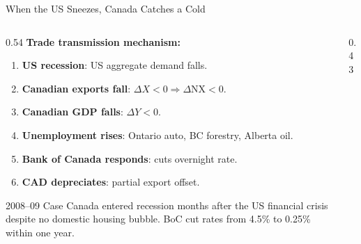 \documentclass[aspectratio=169]{beamer}
\begin{document}
\begin{frame}{When the US Sneezes, Canada Catches a Cold}
\begin{columns}[T]
\begin{column}{0.54\textwidth}
\textbf{Trade transmission mechanism:}
\begin{enumerate}\small
  \item \textbf{US recession}: US aggregate demand falls.
  \item \textbf{Canadian exports fall}: $\Delta X < 0 \Rightarrow \Delta\text{NX} < 0$.
  \item \textbf{Canadian GDP falls}: $\Delta Y < 0$.
  \item \textbf{Unemployment rises}: Ontario auto, BC forestry, Alberta oil.
  \item \textbf{Bank of Canada responds}: cuts overnight rate.
  \item \textbf{CAD depreciates}: partial export offset.
\end{enumerate}
\vspace{0.2em}
\begin{insight}{2008--09 Case}
\footnotesize Canada entered recession months after the US financial crisis despite no domestic housing bubble. BoC cut rates from 4.5\% to 0.25\% within one year.
\end{insight}
\end{column}
\begin{column}{0.43\textwidth}
\end{column}
\end{columns}
\end{frame}
\end{document}
